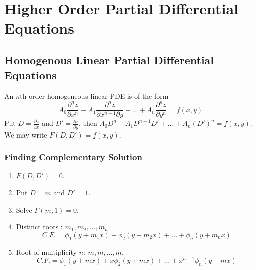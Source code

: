 \chapter{Higher Order Partial Differential Equations}

\section{Homogenous Linear Partial Differential Equations}
\begin{definition}
An $n$th order homogeneous linear PDE is of the form
$$A_0 \frac{\partial^n z}{\partial x^n} + A_1 \frac{\partial^n z}{\partial x^{n-1} \partial y} + \dots + A_n \frac{\partial^n z}{\partial y^n} = f(x,y)$$
Put $D = \frac{\partial z}{\partial x}$ and $D' = \frac{\partial z}{\partial y}$, then $A_0D^n + A_1D^{n-1}D' + \dots + A_n (D')^n = f(x,y)$. We may write $F(D,D') = f(x,y)$.
\end{definition}


\subsection{Finding Complementary Solution}
\begin{enumerate}
	\item $F(D,D') = 0$.
	\item Put $D = m$ and $D' =1$.
	\item Solve $F(m,1) = 0$.
	\item Distinct roots : $m_1,m_2,\dots,m_n$.
	$$C.F. = \phi_1(y+m_1x) + \phi_2(y+m_2x) + \dots + \phi_n(y+m_nx)$$
	\item Root of multiplicity $n$: $m,m,\dots,m$.
	$$C.F. = \phi_1(y+mx) + x\phi_2(y+mx) + \dots + x^{n-1}\phi_n(y+mx)$$
\end{enumerate}

